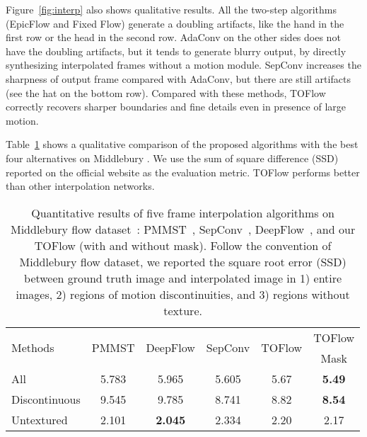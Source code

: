 \documentclass[twocolumn,natbib]{svjour3}          \smartqed  \usepackage{graphicx}
\newcommand{\fig}[1]{Figure~\ref{#1}}
\newcommand{\tbl}[1]{Table~\ref{#1}}
\def\model{TOFlow\xspace}
\def\fflow{Fixed Flow\xspace}
\def\epicflow{EpicFlow\xspace}
\begin{document}
\fig{fig:interp} also shows qualitative results. All the two-step algorithms (\epicflow and \fflow) generate a doubling artifacts, like the hand in the first row or the head in the second row. AdaConv on the other sides does not have the doubling artifacts, but it tends to generate blurry output, by directly synthesizing interpolated frames without a motion module. SepConv increases the sharpness of output frame compared with AdaConv, but there are still artifacts (see the hat on the bottom row). Compared with these methods, \model correctly recovers sharper boundaries and fine details even in presence of large motion.  

\tbl{tbl:middlebury} shows a qualitative comparison of the proposed algorithms with the best four alternatives on Middlebury \citep{baker2011database}. We use the sum of square difference (SSD) reported on the official website as the evaluation metric. \model performs better than other interpolation networks. 

\begin{table}[t]
\centering
\small
\setlength{\tabcolsep}{3pt}
\begin{tabular}{lccccc}
    \toprule
    \multirow{2}{*}{Methods} & \multirow{2}{*}{PMMST} & \multirow{2}{*}{DeepFlow} & \multirow{2}{*}{SepConv} & \multirow{2}{*}{TOFlow} & TOFlow\\
    & & & & & Mask\\
    \midrule
    All  & 5.783 & 5.965 & 5.605 & 5.67 & \textbf{5.49}\\
    Discontinuous  & 9.545 & 9.785 & 8.741 & 8.82 & \textbf{8.54}\\
    Untextured & 2.101 & \textbf{2.045} & 2.334 & 2.20 & 2.17\\
    \bottomrule
\end{tabular}
\caption{Quantitative results of five frame interpolation algorithms on Middlebury flow dataset~\citep{baker2011database}: PMMST~\citep{xu2015pm}, SepConv~\citep{niklaus2017iccv}, DeepFlow~\citep{Liu2017Video}, and our TOFlow (with and without mask). Follow the convention of Middlebury flow dataset, we reported the square root error (SSD) between ground truth image and interpolated image in 1) entire images, 2) regions of motion discontinuities, and 3) regions without texture.}
\label{tbl:middlebury}

\end{table}
\end{document}
